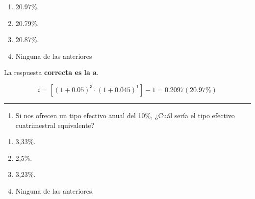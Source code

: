 \documentclass[
  letterpaper,
  DIV=11,
  numbers=noendperiod]{scrreprt}
\providecommand{\tightlist}{%
  \setlength{\itemsep}{0pt}\setlength{\parskip}{0pt}}\usepackage{longtable,booktabs,array}
\begin{document}
\begin{enumerate}
\def\labelenumi{\alph{enumi})}
\item
  20.97\%.
\item
  20.79\%.
\item
  20.87\%.
\item
  Ninguna de las anteriores
\end{enumerate}

\begin{tcolorbox}[enhanced jigsaw, left=2mm, opacityback=0, colback=white, breakable, arc=.35mm, bottomrule=.15mm, rightrule=.15mm, toprule=.15mm, leftrule=.75mm, colframe=quarto-callout-tip-color-frame]
\begin{minipage}[t]{5.5mm}
\textcolor{quarto-callout-tip-color}{\faLightbulb}
\end{minipage}%
\begin{minipage}[t]{\textwidth - 5.5mm}

La respuesta \textbf{correcta es la a}.

\[i=\left[\left(1+0.05\right)^3\cdot\left(1+0.045\right)^1\right]-1=0.2097(20.97\%)\]

\end{minipage}%
\end{tcolorbox}

\begin{center}\rule{0.5\linewidth}{0.5pt}\end{center}

\begin{enumerate}
\def\labelenumi{\arabic{enumi}.}
\setcounter{enumi}{21}
\tightlist
\item
  Si nos ofrecen un tipo efectivo anual del 10\%, ¿Cuál sería el tipo
  efectivo cuatrimestral equivalente?
\end{enumerate}

\begin{enumerate}
\def\labelenumi{\alph{enumi})}
\item
  3,33\%.
\item
  2,5\%.
\item
  3,23\%.
\item
  Ninguna de las anteriores.
\end{enumerate}
\end{document}
